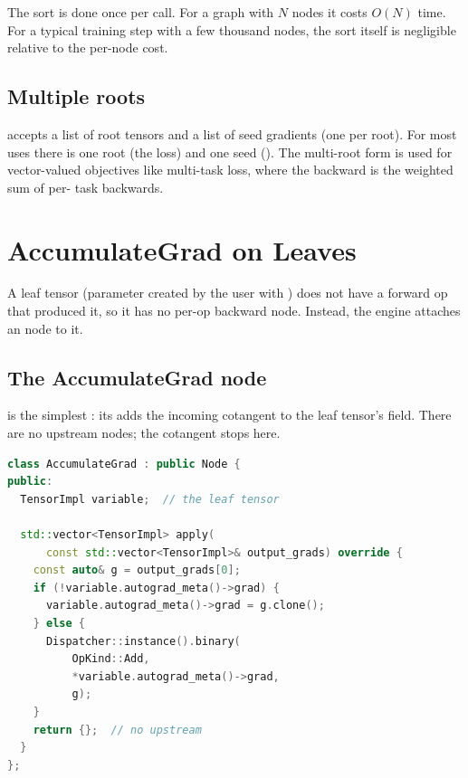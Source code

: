 The sort is done once per  call. For a graph
with $N$ nodes it costs $O(N)$ time. For a typical training step
with a few thousand nodes, the sort itself is negligible
relative to the per-node  cost.

\subsection{Multiple roots}
\label{ssec:autograd_engine:multi_root}

 accepts a list of root tensors and a
list of seed gradients (one per root). For most uses there is one
root (the loss) and one seed (). The
multi-root form is used for vector-valued objectives like
multi-task loss, where the backward is the weighted sum of per-
task backwards.

\section{AccumulateGrad on Leaves}
\label{sec:autograd_engine:accumulate}

A leaf tensor (parameter created by the user with
) does not have a forward op that
produced it, so it has no per-op backward node. Instead, the
engine attaches an  node to it.

\subsection{The AccumulateGrad node}
\label{ssec:autograd_engine:accumg_node}

 is the simplest : its
 adds the incoming cotangent to the leaf tensor's
 field. There are no upstream nodes; the cotangent
stops here.

\begin{lstlisting}[style=lucidcpp,language=C++]
class AccumulateGrad : public Node {
public:
  TensorImpl variable;  // the leaf tensor

  std::vector<TensorImpl> apply(
      const std::vector<TensorImpl>& output_grads) override {
    const auto& g = output_grads[0];
    if (!variable.autograd_meta()->grad) {
      variable.autograd_meta()->grad = g.clone();
    } else {
      Dispatcher::instance().binary(
          OpKind::Add,
          *variable.autograd_meta()->grad,
          g);
    }
    return {};  // no upstream
  }
};
\end{lstlisting}

